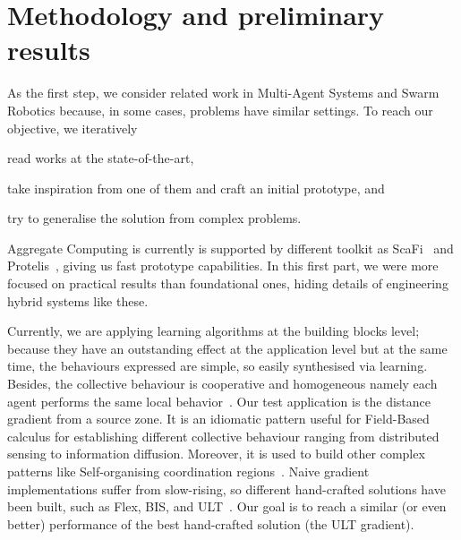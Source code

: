 \documentclass[conference]{IEEEtran}
\begin{document}
\section{Methodology and preliminary results}
%
As the first step, we consider related work in Multi-Agent Systems and Swarm Robotics because, in some cases, problems have similar settings.
To reach our objective, we iteratively 
\begin{enumerate*}[label=(\roman*)]
\item read works at the state-of-the-art,
\item take inspiration from one of them and craft an initial prototype, and
\item try to generalise the solution from complex problems.
\end{enumerate*}
Aggregate Computing is currently is supported by different toolkit as ScaFi~\cite{DBLP:conf/ecoop/CasadeiV16} and Protelis~\cite{DBLP:conf/sac/PianiniVB15}, giving us fast prototype capabilities.
In this first part, we were more focused on practical results than foundational ones, hiding details of engineering hybrid systems like these.  

Currently, we are applying learning algorithms at the building blocks level; because they have an outstanding effect at the application level but
at the same time, the behaviours expressed are simple, so easily synthesised via learning.
Besides, the collective behaviour is cooperative and homogeneous namely each agent performs the same local behavior~\cite{DBLP:journals/aamas/PanaitL05}.  %
%
Our test application is the distance gradient from a source zone. 
It is an idiomatic pattern useful for Field-Based calculus for establishing different collective behaviour ranging from distributed sensing to information diffusion.
Moreover, it is used to build other complex patterns like Self-organising coordination regions~\cite{DBLP:conf/coordination/CasadeiPVN19}.
%
Naive gradient implementations suffer from slow-rising, so different hand-crafted solutions have been built, such as Flex, BIS, and ULT~\cite{DBLP:conf/saso/AudritoCDV17}.
Our goal is to reach a similar (or even better) performance of the best hand-crafted solution (the ULT gradient).
\end{document}
